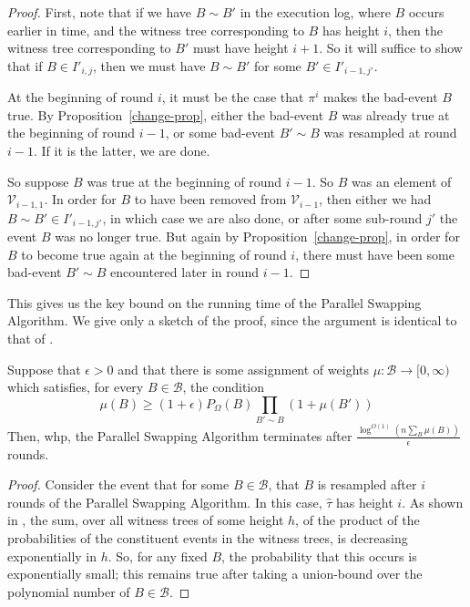 \begin{proof}
First, note that if we have $B \sim B'$ in the execution log, where $B$ occurs earlier in time, and the witness tree corresponding to $B$ has height $i$, then the witness tree corresponding to $B'$ must have height $i+1$. So it will suffice to show that if $B \in I'_{i,j}$, then we must have $B \sim B'$ for some $B' \in I'_{i-1, j'}$.

At the beginning of round $i$, it must be the case that $\pi^{i}$ makes the bad-event $B$ true. By Proposition~\ref{change-prop}, either the bad-event $B$ was already true at the beginning of round $i-1$, or some bad-event $B' \sim B$ was resampled at round $i-1$. If it is the latter, we are done. 

So suppose $B$ was true at the beginning of round $i-1$. So $B$ was an element of $\mathcal V_{i-1,1}$.  In order for $B$ to have been removed from $\mathcal V_{i-1}$, then either we had $B \sim B' \in I'_{i-1, j'}$, in which case we are also done, or after some sub-round $j'$ the event $B$ was no longer true. But again by Proposition~\ref{change-prop}, in order for $B$ to become true again at the beginning of round $i$, there must have been some bad-event $B' \sim B$ encountered later in round $i-1$.
\end{proof}

This gives us the key bound on the running time of the Parallel Swapping Algorithm. We give only a sketch of the proof, since the argument is identical to that of \cite{moser-tardos}.

\begin{proposition}
Suppose  that $\epsilon > 0$ and that there is some assignment of weights $\mu: \mathcal B \rightarrow [0, \infty)$ which satisfies, for every $B \in \mathcal B$, the condition
$$
\mu(B) \geq (1 +\epsilon) P_{\Omega}(B) \prod_{B' \sim B} (1 + \mu(B'))
$$
Then, whp, the Parallel Swapping Algorithm terminates after $\frac{\log^{O(1)} (n \sum_B \mu(B))}{\epsilon}$ rounds. 
\end{proposition}
\begin{proof}
Consider the event that for some $B \in \mathcal B$, that $B$ is resampled after $i$ rounds of the Parallel Swapping Algorithm. In this case, $\hat \tau$ has height $i$. As shown in \cite{moser-tardos}, the sum, over all witness trees of some height $h$, of the product of the probabilities of the constituent events in the witness trees, is decreasing exponentially in $h$. So, for any fixed $B$, the probability that this occurs is exponentially small; this remains true after taking a union-bound over the polynomial number of $B \in \mathcal B$.
\end{proof}

